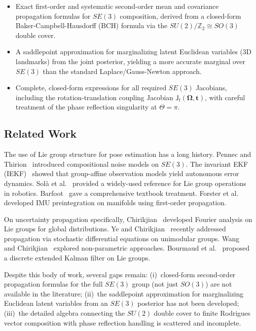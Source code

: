\documentclass[journal]{IEEEtran}
\newcommand{\bfOmega}{\boldsymbol{\Omega}}
\begin{document}
\begin{itemize}
\item Exact first-order and systematic second-order mean and 
covariance propagation formulas for $SE(3)$ composition, 
derived from a closed-form Baker-Campbell-Hausdorff (BCH) 
formula via the $SU(2)/\mathbb{Z}_2 \cong SO(3)$ double cover.

\item A saddlepoint approximation for marginalizing latent 
Euclidean variables (3D landmarks) from the joint posterior, 
yielding a more accurate marginal over $SE(3)$ than the 
standard Laplace/Gauss-Newton approach.

\item Complete, closed-form expressions for all required 
$SE(3)$ Jacobians, including the rotation-translation 
coupling Jacobian $\mathsf{J}_t(\bfOmega, \mathbf{t})$, 
with careful treatment of the phase reflection singularity 
at $\Theta = \pi$.
\end{itemize}

\subsection{Related Work}

The use of Lie group structure for pose estimation has a long 
history. Pennec and Thirion~\cite{pennec97} introduced 
compositional noise models on $SE(3)$. The invariant EKF 
(IEKF)~\cite{barrau2017invariant} showed that group-affine 
observation models yield autonomous error dynamics. 
Sol\`{a} et al.~\cite{sola2018micro} provided a widely-used 
reference for Lie group operations in robotics. 
Barfoot~\cite{barfoot2024} gave a comprehensive textbook treatment.
Forster et al.~\cite{forster2017manifold} developed 
IMU preintegration on manifolds using first-order propagation.

On uncertainty propagation specifically, 
Chirikjian~\cite{chirikjian2012stochastic} developed Fourier 
analysis on Lie groups for global distributions. 
Ye and Chirikjian~\cite{ye2024uncertainty} recently addressed 
propagation via stochastic differential equations on unimodular 
groups. Wang and Chirikjian~\cite{wang2008nonparametric} 
explored non-parametric approaches. 
Bourmaud et al.~\cite{bourmaud2013discrete} proposed a 
discrete extended Kalman filter on Lie groups.

Despite this body of work, several gaps remain:
(i)~closed-form second-order propagation formulas for the 
full $SE(3)$ group (not just $SO(3)$) are not available 
in the literature;
(ii)~the saddlepoint approximation for marginalizing 
Euclidean latent variables from an $SE(3)$ posterior has 
not been developed;
(iii)~the detailed algebra connecting the $SU(2)$ double 
cover to finite Rodrigues vector composition with phase 
reflection handling is scattered and incomplete.
\end{document}
